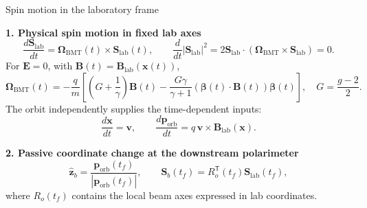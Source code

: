 \documentclass[aspectratio=169,11pt]{beamer}
\newcommand{\vct}[1]{\bm{#1}}
\begin{document}
\begin{frame}{Spin motion in the laboratory frame}
  \small
  \setlength{\abovedisplayskip}{0.35em}
  \setlength{\belowdisplayskip}{0.35em}

  \textbf{1. Physical spin motion in fixed lab axes}
  \[
    \boxed{\frac{d\vct S_{\mathrm{lab}}}{dt}
      =\vct\Omega_{\mathrm{BMT}}(t)\!\times\!\vct S_{\mathrm{lab}}(t)},
    \qquad
    \frac{d}{dt}|\vct S_{\mathrm{lab}}|^2
      =2\vct S_{\mathrm{lab}}\!\cdot\!
       (\vct\Omega_{\mathrm{BMT}}\!\times\!\vct S_{\mathrm{lab}})=0.
  \]
  For $\vct E=0$, with $\vct B(t)=\vct B_{\mathrm{lab}}(\vct x(t))$,
  \[
    \vct\Omega_{\mathrm{BMT}}(t)=-\frac qm\left[
      \left(G+\frac1\gamma\right)\vct B(t)
      -\frac{G\gamma}{\gamma+1}
       (\vct\beta(t)\!\cdot\!\vct B(t))\vct\beta(t)
    \right],
    \quad G=\frac{g-2}{2}.
  \]
  The orbit independently supplies the time-dependent inputs:
  \[
    \frac{d\vct x}{dt}=\vct v,
    \qquad
    \frac{d\vct p_{\mathrm{orb}}}{dt}
      =q\,\vct v\!\times\!\vct B_{\mathrm{lab}}(\vct x).
  \]

  \vspace{0.20em}
  \textbf{2. Passive coordinate change at the downstream polarimeter}
  \[
    \hat{\vct z}_b
      =\frac{\vct p_{\mathrm{orb}}(t_f)}{|\vct p_{\mathrm{orb}}(t_f)|},
    \qquad
    \vct S_b(t_f)=R_o^{\mathsf T}(t_f)\vct S_{\mathrm{lab}}(t_f),
  \]
  where $R_o(t_f)$ contains the local beam axes expressed in lab coordinates.

\end{frame}
\end{document}
